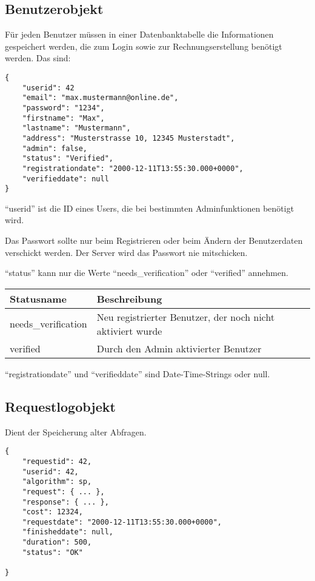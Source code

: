 \documentclass[ngerman,titlepage,parskip=true]{scrartcl}
\begin{document}
	\subsection{Benutzerobjekt}
	\label{benutzerobjekt}
	Für jeden Benutzer müssen in einer Datenbanktabelle die Informationen gespeichert werden, die zum Login sowie zur Rechnungserstellung benötigt werden. 	
	Das sind:
	
\begin{lstlisting}
{
	"userid": 42
	"email": "max.mustermann@online.de",
	"password": "1234",
	"firstname": "Max",
	"lastname": "Mustermann",
	"address": "Musterstrasse 10, 12345 Musterstadt",
	"admin": false,
	"status": "Verified",
	"registrationdate": "2000-12-11T13:55:30.000+0000",
	"verifieddate": null
}
\end{lstlisting}
	
	``userid'' ist die ID eines Users, die bei bestimmten Adminfunktionen benötigt wird.
	
	Das Passwort sollte nur beim Registrieren oder beim Ändern der Benutzerdaten verschickt werden. Der Server wird das Passwort nie mitschicken.
	
	``status'' kann nur die Werte ``needs{\_}verification'' oder ``verified'' annehmen. 
	
	\begin{tabular}{|p{}|p{}|}
	\hline
	Statusname 	& Beschreibung \\\hline
	needs{\_}verification 	& Neu registrierter Benutzer, der noch nicht aktiviert wurde\\
	verified 				& Durch den Admin aktivierter Benutzer \\
	\hline
	\end{tabular}	
	
	
	``registrationdate'' und ``verifieddate'' sind Date-Time-Strings oder null. 
	
	\subsection{Requestlogobjekt}	
	Dient der Speicherung alter Abfragen.
	\label{requestlogobjekt}

\begin{lstlisting}
{
	"requestid": 42,
	"userid": 42,
	"algorithm": sp,
	"request": { ... },
	"response": { ... },
	"cost": 12324,
	"requestdate": "2000-12-11T13:55:30.000+0000",
	"finisheddate": null,
	"duration": 500,
	"status": "OK"
	
}
\end{lstlisting}
\end{document}
